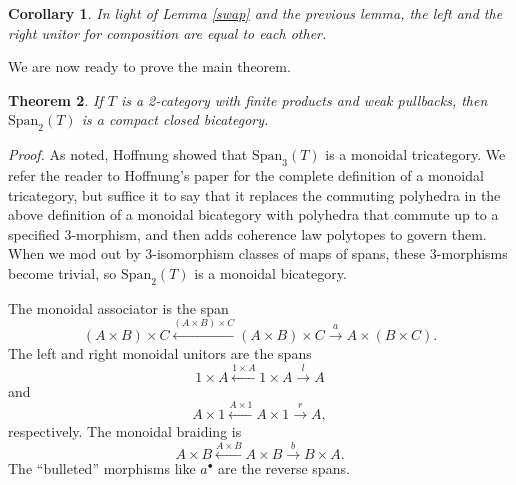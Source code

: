 \documentclass[12pt,twoside,openright]{report}
\newtheorem{thm}{Theorem}
\newcommand{\Span}{\mbox{Span}}
\newtheorem{cor}[thm]{Corollary}
\begin{document}
\begin{cor}
  In light of Lemma \ref{swap} and the previous lemma, the left and the right unitor for composition are equal to each other.
\end{cor}
\fi %

We are now ready to prove the main theorem.

\begin{thm}
  \label{Span2}
  If $T$ is a 2-category with finite products and weak pullbacks, then $\Span_2(T)$ is a compact closed bicategory.
\end{thm}
{\em Proof.} As noted, Hoffnung \cite{Hoffnung} showed that $\Span_3(T)$
is a monoidal tricategory.  We refer the reader to Hoffnung's paper for the complete definition of a monoidal tricategory, but suffice it to say that it replaces the commuting polyhedra in the above definition of a monoidal bicategory with polyhedra that commute up to a specified 3-morphism, and then adds coherence law polytopes to govern them.  When we mod out by 3-isomorphism classes of maps of spans, these 3-morphisms become trivial, so $\Span_2(T)$ is a monoidal bicategory.

The monoidal associator is the span $$(A\times B)\times C \stackrel{(A\times B)\times C}{\leftarrow} (A\times B)\times C \stackrel{a}{\to} A\times (B\times C).$$  The left and right monoidal unitors are the spans $$1\times A \stackrel{1\times A}{\leftarrow} 1\times A \stackrel{l}{\to} A$$ and $$A\times 1 \stackrel{A\times 1}{\leftarrow} A\times 1 \stackrel{r}{\to} A,$$ respectively.  The monoidal braiding is $$A\times B \stackrel{A\times B}{\leftarrow} A\times B \stackrel{b}{\to} B\times A.$$   The ``bulleted'' morphisms like $a^\bullet$ are the reverse spans.
\end{document}
